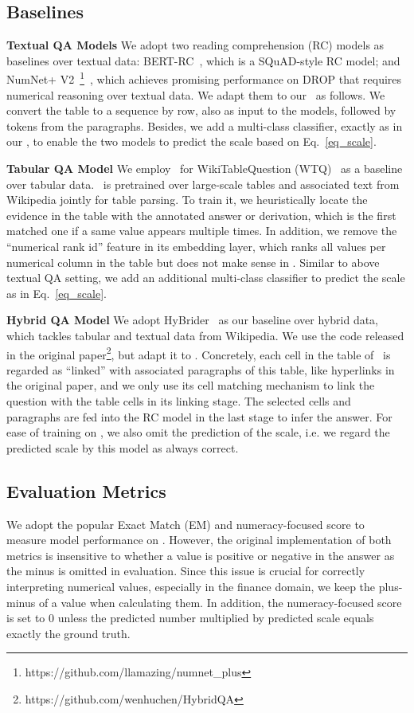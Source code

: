 
\subsection{Baselines}
\label{sec:baselines}
\noindent \textbf{Textual QA Models}
We adopt two reading comprehension (RC) models as baselines over textual data: BERT-RC~\citep{Devlin2018Bert}, which is a SQuAD-style RC model;
and NumNet+ V2~\footnote{https://github.com/llamazing/numnet\_plus}~\citep{ran2019numnet}, which achieves promising performance on DROP that requires numerical reasoning over textual data.
We adapt them to our \finqa~as follows.
We convert the table to a sequence by row, also as input to the models, followed by tokens from the paragraphs. 
Besides, we add a multi-class classifier, exactly as in our \tagop, to enable the two models to predict the scale based on Eq.~\eqref{eq_scale}.

\noindent \textbf{Tabular QA Model}
We employ \tapas~for WikiTableQuestion (WTQ)~\citep{herzig2020tapas} as a baseline over tabular data.
\tapas~is pretrained over large-scale tables and associated text from Wikipedia jointly for table parsing.
To train it, we heuristically locate the evidence in the table with the annotated answer or derivation, which is the first matched one if a same value appears multiple times.
In addition, we remove the ``numerical rank id'' feature in its embedding layer, which ranks all values per numerical column in the table but does not make sense in \finqa. 
Similar to above textual QA setting, we add an additional multi-class classifier to predict the scale as in Eq.~\eqref{eq_scale}.

\noindent \textbf{Hybrid QA Model}
We adopt HyBrider~\citep{chen2020hybridqa} as our baseline over hybrid data, which tackles tabular and textual data from Wikipedia.
We use the code released in the original paper\footnote{https://github.com/wenhuchen/HybridQA}, but adapt it to \finqa. 
Concretely, each cell in the table of \finqa~is regarded as ``linked'' with associated paragraphs of this table, like hyperlinks in the original paper, and we only use its cell matching mechanism to link the question with the table cells in its linking stage.
The selected cells and paragraphs are fed into the RC model in the last stage to infer the answer.
For ease of training on \finqa, 
we also omit the prediction of the scale, i.e. 
we regard the predicted scale by this model as always correct.

\subsection{Evaluation Metrics}
We adopt the popular Exact Match (EM) and numeracy-focused \fone{} score \citep{Dua2019DROP} to measure model performance on \finqa. 
However, the original implementation of both metrics is insensitive to whether a value is positive or negative in the answer as the minus is omitted in evaluation.  
Since this issue is crucial for correctly interpreting numerical values, especially in the finance domain, we keep the plus-minus of a value when calculating them.
In addition, the numeracy-focused \fone{} score is set to $0$ unless the predicted number multiplied by predicted scale equals exactly the ground truth.


